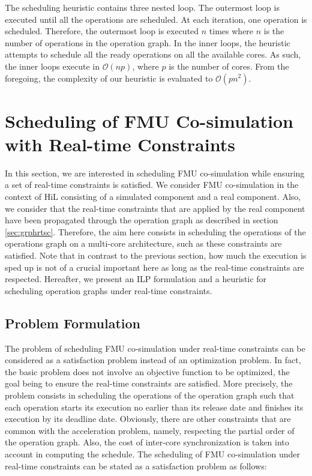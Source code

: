 The scheduling heuristic contains three nested loop. The outermost loop is executed until all the operations are scheduled. At each iteration, one operation is scheduled. Therefore, the outermost loop is executed $n$ times where $n$ is the number of operations in the operation graph. In the inner loops, the heuristic attempts to schedule all the ready operations on all the available cores. As such, the inner loops execute in $\mathcal{O}(np)$, where $p$ is the number of cores. From the foregoing, the complexity of our heuristic is evaluated to $\mathcal{O}(pn^2)$.

\section{Scheduling of FMU Co-simulation with Real-time Constraints}

In this section, we are interested in scheduling FMU co-simulation while ensuring a set of real-time constraints  is satisfied. We consider FMU co-simulation in the context of HiL consisting of a simulated component and a real component. Also, we consider that the real-time constraints that are applied by the real component have been propagated through the operation graph as described in section \ref{sec:grphrtsc}. Therefore, the aim here consists in scheduling the operations of the operations graph on a multi-core architecture, such as these constraints are satisfied. Note that in contrast to the previous section, how much the execution is sped up is not of a crucial important here as long as the real-time constraints are respected. Hereafter, we present an ILP formulation and a heuristic for scheduling operation graphs under real-time constraints.

\subsection{Problem Formulation}

The problem of scheduling FMU co-simulation under real-time constraints can be considered as a satisfaction problem instead of an optimization problem. In fact, the basic problem does not involve an objective function to be optimized, the goal being to ensure the real-time constraints are satisfied. More precisely, the problem consists in scheduling the operations of the operation graph such that each operation starts its execution no earlier than its release date and finishes its execution by its deadline date. Obviously, there are other constraints that are common with the acceleration problem, namely, respecting the partial order of the operation graph. Also, the cost of inter-core synchronization is taken into account in computing the schedule. The scheduling of FMU co-simulation under real-time constraints can be stated as a satisfaction problem as follows:

